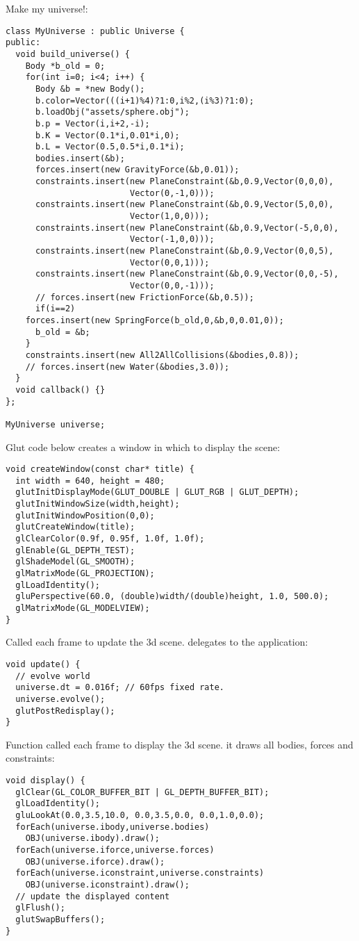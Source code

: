 \noindent
Make my universe!: \begin{lstlisting}
class MyUniverse : public Universe {
public:
  void build_universe() {
    Body *b_old = 0;
    for(int i=0; i<4; i++) {
      Body &b = *new Body();
      b.color=Vector(((i+1)%4)?1:0,i%2,(i%3)?1:0);
      b.loadObj("assets/sphere.obj");
      b.p = Vector(i,i+2,-i);
      b.K = Vector(0.1*i,0.01*i,0);
      b.L = Vector(0.5,0.5*i,0.1*i);
      bodies.insert(&b);
      forces.insert(new GravityForce(&b,0.01));
      constraints.insert(new PlaneConstraint(&b,0.9,Vector(0,0,0),
					     Vector(0,-1,0)));
      constraints.insert(new PlaneConstraint(&b,0.9,Vector(5,0,0),
					     Vector(1,0,0)));
      constraints.insert(new PlaneConstraint(&b,0.9,Vector(-5,0,0),
					     Vector(-1,0,0)));
      constraints.insert(new PlaneConstraint(&b,0.9,Vector(0,0,5),
					     Vector(0,0,1)));
      constraints.insert(new PlaneConstraint(&b,0.9,Vector(0,0,-5),
					     Vector(0,0,-1)));
      // forces.insert(new FrictionForce(&b,0.5));
      if(i==2)
	forces.insert(new SpringForce(b_old,0,&b,0,0.01,0));
      b_old = &b;
    }
    constraints.insert(new All2AllCollisions(&bodies,0.8));
    // forces.insert(new Water(&bodies,3.0));
  }
  void callback() {}
};

MyUniverse universe;
\end{lstlisting}
\noindent
Glut code below
creates a window in which to display the scene: \begin{lstlisting}
void createWindow(const char* title) {
  int width = 640, height = 480;
  glutInitDisplayMode(GLUT_DOUBLE | GLUT_RGB | GLUT_DEPTH);
  glutInitWindowSize(width,height);
  glutInitWindowPosition(0,0);
  glutCreateWindow(title);
  glClearColor(0.9f, 0.95f, 1.0f, 1.0f);
  glEnable(GL_DEPTH_TEST);
  glShadeModel(GL_SMOOTH);  
  glMatrixMode(GL_PROJECTION);
  glLoadIdentity();
  gluPerspective(60.0, (double)width/(double)height, 1.0, 500.0);
  glMatrixMode(GL_MODELVIEW);
}
\end{lstlisting}
\noindent
Called each frame to update the 3d scene. delegates to
the application: \begin{lstlisting}
void update() {
  // evolve world
  universe.dt = 0.016f;	// 60fps fixed rate.
  universe.evolve();
  glutPostRedisplay();
}
\end{lstlisting}
\noindent
Function called each frame to display the 3d scene.
it draws all bodies, forces and constraints: \begin{lstlisting}
void display() {
  glClear(GL_COLOR_BUFFER_BIT | GL_DEPTH_BUFFER_BIT);
  glLoadIdentity();
  gluLookAt(0.0,3.5,10.0, 0.0,3.5,0.0, 0.0,1.0,0.0);
  forEach(universe.ibody,universe.bodies)
    OBJ(universe.ibody).draw();
  forEach(universe.iforce,universe.forces)
    OBJ(universe.iforce).draw();
  forEach(universe.iconstraint,universe.constraints)
    OBJ(universe.iconstraint).draw();
  // update the displayed content
  glFlush();
  glutSwapBuffers();
}
\end{lstlisting}
